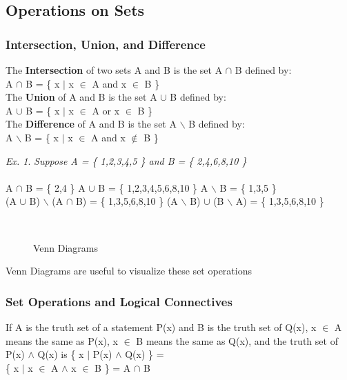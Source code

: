 \documentclass[11pt]{article}
\newcommand{\incsvg}[2]{%
    \def\svgwidth{\columnwidth}
    \graphicspath{{#1}}
    
}
\theoremstyle{definition}
\theoremstyle{remark}
\newtheorem{exer}{Ex.}
\begin{document}
\subsection{Operations on Sets}
\subsubsection{Intersection, Union, and Difference}
\begin{shaded}
The \textbf{Intersection} of two sets A and B is the set A $\cap$ B defined by:\\
A $\cap$ B = \{ x $|$ x $\in$ A and x $\in$ B \} \\
The \textbf{Union} of A and B is the set A $\cup$ B defined by:\\
A $\cup$ B = \{ x $|$ x $\in$ A or x $\in$ B \}\\
The \textbf{Difference} of A and B is the set A $\backslash$ B defined by:\\
A $\backslash$ B = \{ x $|$ x $\in$ A and x $\notin$ B \}
\end{shaded}
\begin{exer}
\textit{Suppose A = \{ 1,2,3,4,5 \} and B = \{ 2,4,6,8,10 \}}\\ \\
A $\cap$ B = \{ 2,4 \} \qquad A $\cup$ B = \{ 1,2,3,4,5,6,8,10 \} \qquad A $\backslash$ B = \{ 1,3,5 \}\\
(A $\cup$ B) $\backslash$ (A $\cap$ B) = \{ 1,3,5,6,8,10 \} \qquad (A $\backslash$ B) $\cup$ (B $\backslash$ A) = \{ 1,3,5,6,8,10 \}
\end{exer}


\begin{figure}[ht!]
	\centering
    \caption{Venn Diagrams}
	\incsvg{images}{images/venn}\\
	\label{VennDiagrams}
\end{figure}
\begin{center}
Venn Diagrams are useful to visualize these set operations
\end{center}
\newpage
\subsubsection{Set Operations and Logical Connectives}

If A is the truth set of a statement P(x) and B is the truth set of Q(x), x $\in$ A means the same as
P(x), x $\in$ B means the same as Q(x), and the truth set of P(x) $\land$ Q(x) is \{ x $|$ P(x) $\land$ Q(x) \} =\\
\{ x $|$ x $\in$ A $\land$ x $\in$ B \} = A $\cap$ B   
\end{document}
